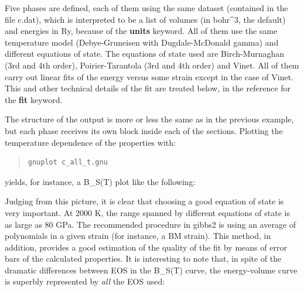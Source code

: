 \documentclass[a4paper]{article}
\begin{document}
Five phases are defined, each of them using the same dataset
(contained in the file c.dat), which is interpreted to be a list of
volumes (in bohr\textasciicircum{}3, the default) and energies in Ry, because of the
\textbf{units} keyword. All of them use the same temperature model
(Debye-Gruneisen with Dugdale-McDonald gamma) and different equations
of state. The equations of state used are Birch-Murnaghan (3rd and 4th
order), Poirier-Tarantola (3rd and 4th order) and Vinet. All of them
carry out linear fits of the energy versus some strain except in the
case of Vinet. This and other technical details of the fit are treated
below, in the reference for the \textbf{fit} keyword.

The structure of the output is more or less the same as in the
previous example, but each phase receives its own block inside each of
the sections. Plotting the temperature dependence of the properties
with:

\begin{quote}
\begin{verbatim}
gnuplot c_all_t.gnu
\end{verbatim}
\end{quote}

yields, for instance, a B\_S(T) plot like the following:

\noindent{}

Judging from this picture, it is clear that choosing a good equation
of state is very important. At 2000 K, the range spanned by different
equations of state is as large as 80 GPa. The recommended procedure in
gibbs2 is using an average of polynomials in a given strain (for
instance, a BM strain). This method, in addition, provides a good
estimation of the quality of the fit by means of error bars of the
calculated properties. It is interesting to note that, in spite of the
dramatic differences between EOS in the B\_S(T) curve, the
energy-volume curve is superbly represented by \emph{all} the EOS used:
\end{document}
